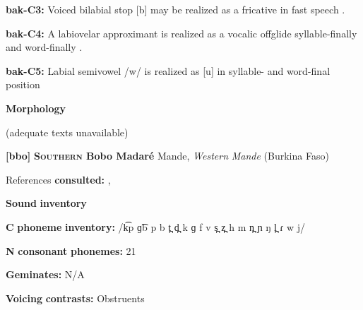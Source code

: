 \documentclass[output=paper]{langsci/langscibook}
\begin{document}
\begin{styleBody}
\textbf{bak-C3:} Voiced bilabial stop [b] may be realized as a fricative in fast speech \citep[8]{Poppe1964}.
\end{styleBody}

\begin{styleBody}
\textbf{bak-C4:}  A labiovelar approximant is realized as a vocalic offglide syllable-finally and word-finally \citep[9]{Poppe1964}.
\end{styleBody}

\begin{styleBody}
\textbf{bak-C5:} Labial semivowel /w/ is realized as [u] in syllable- and word-final position \citep[9]{Poppe1964}
\end{styleBody}

\begin{styleBody}
\textbf{Morphology}
\end{styleBody}

\begin{styleBody}
(adequate texts unavailable)
\end{styleBody}

\begin{styleBody}
\textbf{[bbo]}   \textbf{\textsc{Southern} \textbf{Bobo} \textbf{Madaré}}  Mande, \textit{Western} \textit{Mande} (Burkina Faso)
\end{styleBody}

\begin{styleBody}
References \textbf{consulted:} \citet{Morse1976}, \citet{Sanou1978}
\end{styleBody}

\begin{styleBody}
\textbf{Sound} \textbf{inventory}
\end{styleBody}

\begin{styleBody}
\textbf{C} \textbf{phoneme} \textbf{inventory:} /k͡p ɡ͡b p b t̪ d̪ k ɡ f v s̪ z̪ h m n̪ ɲ ŋ l̪ ɾ w j/
\end{styleBody}

\begin{styleBody}
\textbf{N} \textbf{consonant} \textbf{phonemes:} 21
\end{styleBody}

\begin{styleBody}
\textbf{Geminates:} N/A
\end{styleBody}

\begin{styleBody}
\textbf{Voicing} \textbf{contrasts:} Obstruents
\end{styleBody}
\end{document}
